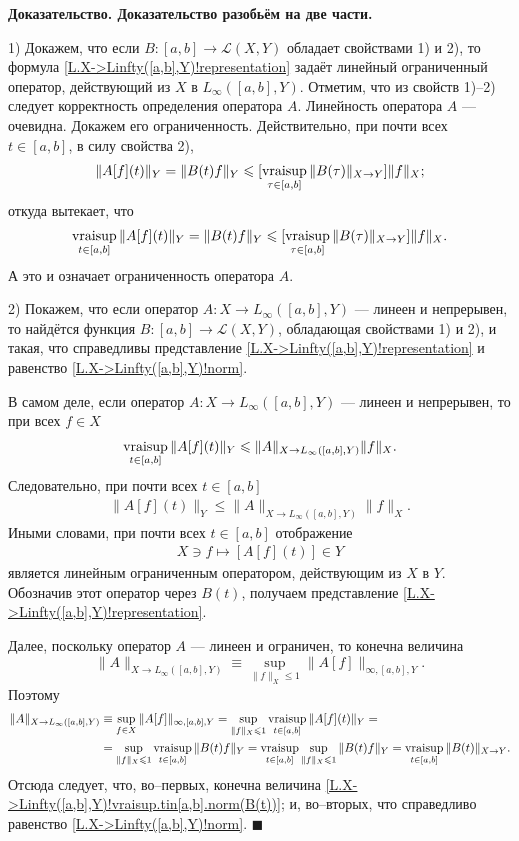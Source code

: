 \documentclass{report}
\newenvironment{Proof}{\par\noindent\bf Доказательство.\rm}{ $\blacksquare$\par}
\newcommand{\vraisup}{\mathop{\rm vraisup}}
\begin{document}
\begin{Proof}
Доказательство разобьём на две части.

1) Докажем, что если $B:[a,b]\to\mathcal{L}(X,Y)$ обладает свойствами 1) и 2), то формула \eqref{L.X->Linfty([a,b],Y)!representation} задаёт линейный ограниченный оператор, действующий из
$X$ в $L_\infty([a,b],Y)$. Отметим, что из свойств 1)--2) следует корректность определения оператора $A$. Линейность оператора $A$ --- очевидна. Докажем его ограниченность.
Действительно, при почти всех $t\in[a,b]$, в силу свойства 2),
\begin{gather*}
\|A[f](t)\|_Y=\|B(t)f\|_Y\leqslant[\vraisup\limits_{\tau\in[a,b]}\|B(\tau)\|_{X\to Y}]\|f\|_X;
\end{gather*}
откуда вытекает, что
\begin{gather*}
\vraisup\limits_{t\in[a,b]}\|A[f](t)\|_Y=\|B(t)f\|_Y\leqslant[\vraisup\limits_{\tau\in[a,b]}\|B(\tau)\|_{X\to Y}]\|f\|_X.
\end{gather*}
А это и означает ограниченность оператора $A$.

2) Покажем, что если оператор $A:X\to L_\infty([a,b],Y)$ --- линеен и непрерывен, то найдётся функция $B:[a,b]\to\mathcal{L}(X,Y)$, обладающая свойствами 1) и 2), и такая, что справедливы
представление \eqref{L.X->Linfty([a,b],Y)!representation} и равенство \eqref{L.X->Linfty([a,b],Y)!norm}.

В самом деле, если оператор $A:X\to L_\infty([a,b],Y)$ --- линеен и непрерывен, то при всех $f\in X$
\begin{gather*}
\vraisup\limits_{t\in[a,b]}\|A[f](t)\|_Y\leqslant\|A\|_{X\to L_\infty([a,b],Y)}\|f\|_X.
\end{gather*}
Следовательно, при почти всех $t\in[a,b]$
\begin{gather*}
\|A[f](t)\|_Y\leqslant\|A\|_{X\to L_\infty([a,b],Y)}\|f\|_X.
\end{gather*}
Иными словами, при почти всех $t\in[a,b]$ отображение
\begin{gather*}
X\ni f\mapsto[A[f](t)]\in Y
\end{gather*}
является линейным ограниченным оператором, действующим из $X$ в $Y$. Обозначив этот оператор через $B(t)$, получаем представление \eqref{L.X->Linfty([a,b],Y)!representation}.

Далее, поскольку оператор $A$ --- линеен и ограничен, то конечна величина $$\|A\|_{X\to L_\infty([a,b],Y)}\equiv\sup\limits_{\|f\|_X\leqslant1}\|A[f]\|_{\infty,[a,b],Y}.$$ Поэтому
\begin{align*}
\|A\|_{X\to L_\infty([a,b],Y)}&\equiv\sup\limits_{f\in X}\|A[f]\|_{\infty,[a,b],Y}=\sup\limits_{\|f\|_X\leqslant1}\vraisup\limits_{t\in[a,b]}\|A[f](t)\|_{Y}=\\
&=\sup\limits_{\|f\|_X\leqslant1}\vraisup\limits_{t\in[a,b]}\|B(t)f\|_{Y}=\vraisup\limits_{t\in[a,b]}\sup\limits_{\|f\|_X\leqslant1}\|B(t)f\|_{Y}=
\vraisup\limits_{t\in[a,b]}\|B(t)\|_{X\to Y}.
\end{align*}
Отсюда следует, что, во--первых, конечна величина \eqref{L.X->Linfty([a,b],Y)!vraisup.tin[a,b].norm(B(t))}; и, во--вторых, что справедливо равенство \eqref{L.X->Linfty([a,b],Y)!norm}.
\end{Proof}
\end{document}

